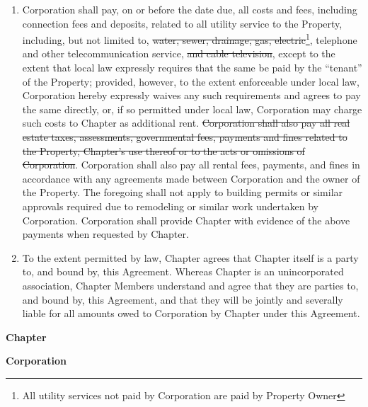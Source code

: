 \documentclass[12pt]{article}
\begin{document}
\begin{enumerate}
        \item Corporation shall pay, on or before the date due, all costs and fees, including connection fees and deposits, related to all utility service to the Property, including, but not limited to, \st{water, sewer, drainage, gas, electric}\footnote{All utility services not paid by Corporation are paid by Property Owner}, telephone and other telecommunication service, \st{and cable television}, except to the extent that local law expressly requires that the same be paid by the ``tenant'' of the Property; provided, however, to the extent enforceable under local law, Corporation hereby expressly waives any such requirements and agrees to pay the same directly, or, if so permitted under local law, Corporation may charge such costs to Chapter as additional rent.
                \st{Corporation shall also pay all real estate taxes, assessments, governmental fees, payments and fines related to the Property, Chapter's use thereof or to the acts or omissions of Corporation}.
                Corporation shall also pay all rental fees, payments, and fines in accordance with any agreements made between Corporation and the owner of the Property.
                The foregoing shall not apply to building permits or similar approvals required due to remodeling or similar work undertaken by Corporation. Corporation shall provide Chapter with evidence of the above payments when requested by Chapter.
        \item To the extent permitted by law, Chapter agrees that Chapter itself is a party to, and bound by, this Agreement. Whereas Chapter is an unincorporated association, Chapter Members understand and agree that they are parties to, and bound by, this Agreement, and that they will be jointly and severally liable for all amounts owed to Corporation by Chapter under this Agreement.
\end{enumerate}

\clearpage
\textbf{\large Chapter}

\signature{President}

\signature{Risk Manager}

\signature{House Manager}

\clearpage
\textbf{\large Corporation}

\signature{President}
\end{document}
